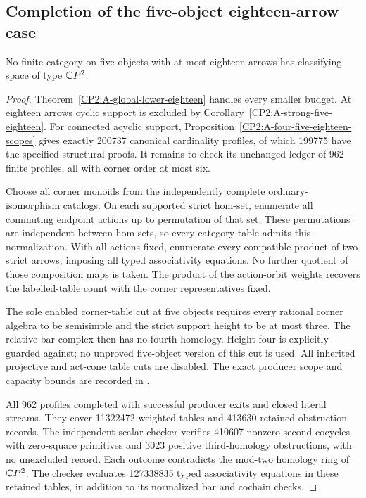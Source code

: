 \subsection{Completion of the five-object eighteen-arrow case}

\begin{theorem}
\label{CP2:A-five-eighteen-complete}
No finite category on five objects with at most eighteen
arrows has classifying space of type $\mathbb{C}P^2$.
\end{theorem}
\begin{proof}
Theorem~\ref{CP2:A-global-lower-eighteen} handles every smaller
budget. At eighteen arrows cyclic support is excluded by
Corollary~\ref{CP2:A-strong-five-eighteen}. For connected
acyclic support, Proposition~\ref{CP2:A-four-five-eighteen-scopes}
gives exactly 200737 canonical cardinality profiles, of which
199775 have the specified structural proofs. It remains to
check its unchanged ledger of 962 finite profiles, all with
corner order at most six.

Choose all corner monoids from the independently complete
ordinary-isomorphism catalogs. On each supported strict hom-set,
enumerate all commuting endpoint actions up to permutation of
that set. These permutations are independent between hom-sets,
so every category table admits this normalization. With all
actions fixed, enumerate every compatible product of two strict
arrows, imposing all typed associativity equations. No further
quotient of those composition maps is taken. The product of
the action-orbit weights recovers the labelled-table count with
the corner representatives fixed.

The sole enabled corner-table cut at five objects requires
every rational corner algebra to be semisimple and the strict
support height to be at most three. The relative bar complex
then has no fourth homology. Height four is explicitly guarded
against; no unproved five-object version of this cut is used.
All inherited projective and act-cone table cuts are disabled.
The exact producer scope and capacity bounds are recorded in
.

All 962 profiles completed with successful producer exits and
closed literal streams. They cover 11322472 weighted tables and
413630 retained obstruction records. The independent scalar
checker verifies 410607 nonzero second cocycles with zero-square
primitives and 3023 positive third-homology obstructions, with
no unexcluded record. Each outcome contradicts the mod-two
homology ring of $\mathbb{C}P^2$. The checker evaluates 127338835 typed
associativity equations in these retained tables, in addition
to its normalized bar and cochain checks.


\end{proof}
